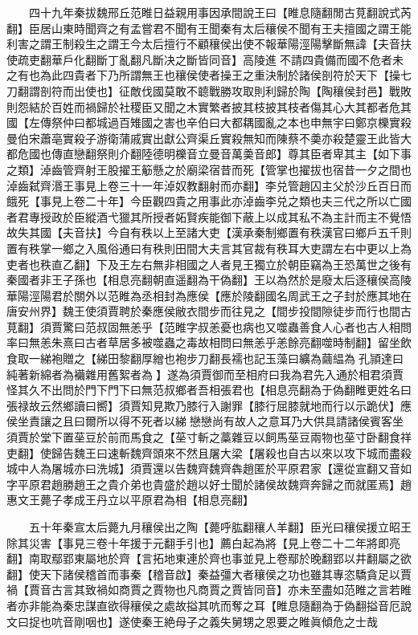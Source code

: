 　　四十九年秦拔魏邢丘范睢日益親用事因承間說王曰【睢息隨翻閒古莧翻說式芮翻】臣居山東時聞齊之有孟嘗君不聞有王聞秦有太后穰侯不聞有王夫擅國之謂王能利害之謂王制殺生之謂王今太后擅行不顧穰侯出使不報華陽涇陽擊斷無諱【夫音扶使疏吏翻華戶化翻斷丁亂翻凡斷决之斷皆同音】高陵進不請四貴備而國不危者未之有也為此四貴者下乃所謂無王也穰侯使者操王之重決制於諸侯剖符於天下【操七刀翻謂剖符而出使也】征敵伐國莫敢不聼戰勝攻取則利歸於陶【陶穰侯封邑】戰敗則怨結於百姓而禍歸於社稷臣又聞之木實繁者披其枝披其枝者傷其心大其都者危其國【左傳祭仲曰都城過百雉國之害也辛伯曰大都耦國亂之本也申無宇曰鄭京櫟實殺曼伯宋蕭亳實殺子游衛蒲戚實出獻公齊渠丘實殺無知而陳蔡不羮亦殺楚靈王此皆大都危國也傳直戀翻祭則介翻陸德明櫟音立曼音萬羮音郎】尊其臣者卑其主【如下事之類】淖齒管齊射王股擢王䈥懸之於廟梁宿昔而死【管掌也擢拔也宿昔一夕之間也淖齒弑齊湣王事見上卷三十一年淖奴教翻射而亦翻】李兑管趙囚主父於沙丘百日而餓死【事見上卷二十年】今臣觀四貴之用事此亦淖齒李兑之類也夫三代之所以亡國者君專授政於臣縱酒弋獵其所授者妬賢疾能御下蔽上以成其私不為主計而主不覺悟故失其國【夫音扶】今自有秩以上至諸大吏【漢承秦制鄉置有秩漢官曰鄉戶五千則置有秩掌一鄉之入風俗通曰有秩則田間大夫言其官裁有秩耳大吏謂左右中更以上為吏者也秩直乙翻】下及王左右無非相國之人者見王獨立於朝臣竊為王恐萬世之後有秦國者非王子孫也【相息亮翻朝直遥翻為干偽翻】王以為然於是廢太后逐穰侯高陵華陽涇陽君於關外以范睢為丞相封為應侯【應於陵翻國名周武王之子封於應其地在唐安州界】魏王使須賈聘於秦應侯敝衣間步而往見之【間步投間隙徒步而行也間古莧翻】須賈驚曰范叔固無恙乎【范睢字叔恙憂也病也又噬蟲善食人心者也古人相問率曰無恙朱熹曰古者草居多被噬蟲之毒故相問曰無恙乎恙餘亮翻噬時制翻】留坐飲食取一綈袍贈之【綈田黎翻厚繒也袍步刀翻長襦也記玉藻曰纊為繭緼為孔頴達曰純著新綿者為襺雜用舊絮者為】遂為須賈御而至相府曰我為君先入通於相君須賈怪其久不出問於門下門下曰無范叔鄉者吾相張君也【相息亮翻為于偽翻睢更姓名曰張禄故云然鄉讀曰嚮】須賈知見欺乃膝行入謝罪【膝行屈膝就地而行以示跪伏】應侯坐責讓之且曰爾所以得不死者以綈戀戀尚有故人之意耳乃大供具請諸侯賓客坐須賈於堂下置莝豆於前而馬食之【莝寸斬之藁雜豆以飼馬莝豆兩物也莝寸卧翻食祥吏翻】使歸告魏王曰速斬魏齊頭來不然且屠大梁【屠殺也自古以來以攻下城而盡殺城中人為屠城亦曰洗城】須賈還以告魏齊魏齊犇趙匿於平原君家【還從宣翻又音如字平原君趙勝趙王之貴介弟也貴盛於趙以好士聞於諸侯故魏齊奔歸之而就匿焉】趙惠文王薨子孝成王丹立以平原君為相【相息亮翻】

　　五十年秦宣太后薨九月穰侯出之陶【薨呼肱翻穰人羊翻】臣光曰穰侯援立昭王除其災害【事見三卷十年援于元翻手引也】薦白起為將【見上卷二十二年將即亮翻】南取鄢郢東屬地於齊【言拓地東連於齊也事並見上卷鄢於晚翻郢以井翻屬之欲翻】使天下諸侯稽首而事秦【稽音啟】秦益彊大者穰侯之功也雖其專恣驕貪足以賈禍【賈音古言其致禍如商賈之賈物也凡商賈之賈皆同音】亦未至盡如范睢之言若睢者亦非能為秦忠謀直欲得穰侯之處故搤其吭而奪之耳【睢息隨翻為于偽翻搤音厄說文曰捉也吭音剛咽也】遂使秦王絶母子之義失舅甥之恩要之睢眞傾危之士哉

